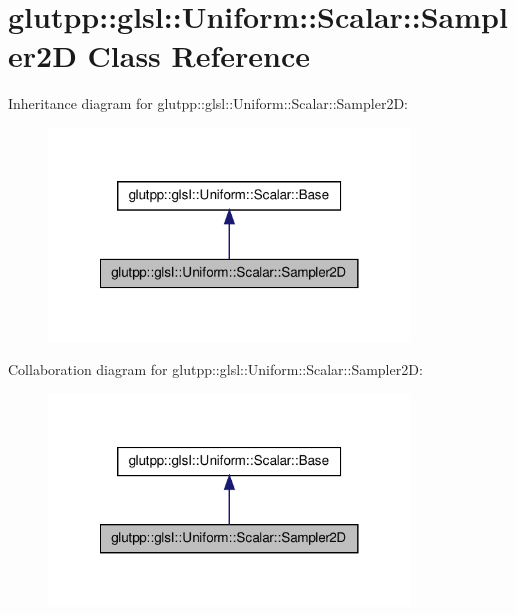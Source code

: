 \hypertarget{classglutpp_1_1glsl_1_1Uniform_1_1Scalar_1_1Sampler2D}{\section{glutpp\-:\-:glsl\-:\-:\-Uniform\-:\-:\-Scalar\-:\-:\-Sampler2\-D \-Class \-Reference}
\label{classglutpp_1_1glsl_1_1Uniform_1_1Scalar_1_1Sampler2D}
}


\-Inheritance diagram for glutpp\-:\-:glsl\-:\-:\-Uniform\-:\-:\-Scalar\-:\-:\-Sampler2\-D\-:\nopagebreak
\begin{figure}[H]
\begin{center}
\leavevmode
\includegraphics[width=272pt]{classglutpp_1_1glsl_1_1Uniform_1_1Scalar_1_1Sampler2D__inherit__graph}
\end{center}
\end{figure}


\-Collaboration diagram for glutpp\-:\-:glsl\-:\-:\-Uniform\-:\-:\-Scalar\-:\-:\-Sampler2\-D\-:\nopagebreak
\begin{figure}[H]
\begin{center}
\leavevmode
\includegraphics[width=272pt]{classglutpp_1_1glsl_1_1Uniform_1_1Scalar_1_1Sampler2D__coll__graph}
\end{center}
\end{figure}
